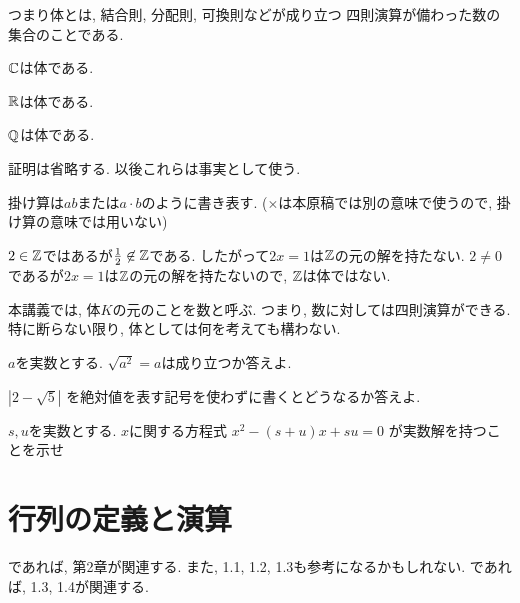 \begin{remark}
  つまり体とは,
  結合則, 分配則, 可換則などが成り立つ
  四則演算が備わった数の集合のことである.
\end{remark}


\begin{example}
  $\mathbb{C}$は体である.
\end{example}
\begin{example}
  $\mathbb{R}$は体である.
\end{example}
\begin{example}
  $\mathbb{Q}$は体である.
\end{example}
\begin{remark}
  証明は省略する.
  以後これらは事実として使う.
\end{remark}
\begin{remark}
  掛け算は$ab$または$a\cdot b$のように書き表す.
  ($\times$は本原稿では別の意味で使うので,
  掛け算の意味では用いない)
\end{remark}


\begin{example}
  $2\in\mathbb{Z}$ではあるが$\frac{1}{2}\not\in \mathbb{Z}$である.
  したがって$2x=1$は$\mathbb{Z}$の元の解を持たない.
  $2\neq 0$であるが$2x=1$は$\mathbb{Z}$の元の解を持たないので,
  $\mathbb{Z}$は体ではない.
\end{example}

本講義では,
体$K$の元のことを数と呼ぶ.
つまり,
数に対しては四則演算ができる.
特に断らない限り,
体としては何を考えても構わない.


\begin{quiz}
  $a$を実数とする.
  $\sqrt{a^2}=a$は成り立つか答えよ.
\end{quiz}


\begin{quiz}
$|2-\sqrt{5}|$
を絶対値を表す記号を使わずに書くとどうなるか答えよ.
\end{quiz}

\begin{quiz}
    $s,u$を実数とする.
    $x$に関する方程式
    $x^2-(s+u)x+su=0$
    が実数解を持つことを示せ
\end{quiz}


\chapter{行列の定義と演算}
\label{chap:mat}
\cite{978-4-7806-0772-7}であれば,
第2章が関連する.
また, 1.1, 1.2, 1.3も参考になるかもしれない.
\cite{978-4-7806-0164-0}であれば,
1.3, 1.4が関連する.

